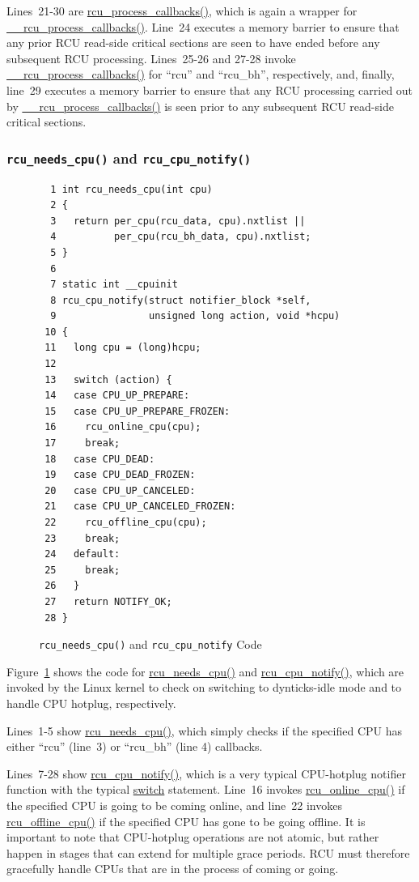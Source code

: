 Lines~21-30 are \url{rcu_process_callbacks()}, which is again a
wrapper for \url{__rcu_process_callbacks()}.
Line~24 executes a memory barrier to ensure that any prior RCU
read-side critical sections are seen to have ended before any
subsequent RCU processing.
Lines~25-26 and 27-28 invoke \url{__rcu_process_callbacks()} for
``rcu'' and ``rcu\_bh'', respectively, and, finally,
line~29 executes a memory barrier to ensure that any RCU
processing carried out by \url{__rcu_process_callbacks()}
is seen prior to any subsequent RCU read-side critical sections.

\subsubsection{{\tt rcu\_needs\_cpu()} and {\tt rcu\_cpu\_notify()}}
\label{app:rcuimpl:rcutreewt:rcu-needs-cpu and rcu-cpu-notify}

\begin{figure}[tbp]
{ \scriptsize
\begin{verbatim}
  1 int rcu_needs_cpu(int cpu)
  2 {
  3   return per_cpu(rcu_data, cpu).nxtlist ||
  4          per_cpu(rcu_bh_data, cpu).nxtlist;
  5 }
  6 
  7 static int __cpuinit
  8 rcu_cpu_notify(struct notifier_block *self,
  9                unsigned long action, void *hcpu)
 10 {
 11   long cpu = (long)hcpu;
 12 
 13   switch (action) {
 14   case CPU_UP_PREPARE:
 15   case CPU_UP_PREPARE_FROZEN:
 16     rcu_online_cpu(cpu);
 17     break;
 18   case CPU_DEAD:
 19   case CPU_DEAD_FROZEN:
 20   case CPU_UP_CANCELED:
 21   case CPU_UP_CANCELED_FROZEN:
 22     rcu_offline_cpu(cpu);
 23     break;
 24   default:
 25     break;
 26   }
 27   return NOTIFY_OK;
 28 }
\end{verbatim}
}
\caption{{\tt rcu\_needs\_cpu()} and {\tt rcu\_cpu\_notify}  Code}
\label{fig:app:rcuimpl:rcutreewt:Code for rcu-needs-cpu and rcu-cpu-notify}
\end{figure}

Figure~\ref{fig:app:rcuimpl:rcutreewt:Code for rcu-needs-cpu and rcu-cpu-notify}
shows the code for \url{rcu_needs_cpu()} and \url{rcu_cpu_notify()},
which are invoked by the Linux kernel to check on switching to
dynticks-idle mode and to handle CPU hotplug, respectively.

Lines~1-5 show \url{rcu_needs_cpu()}, which simply checks if the specified
CPU has either ``rcu'' (line~3) or ``rcu\_bh'' (line 4) callbacks.

Lines~7-28 show \url{rcu_cpu_notify()}, which is a very typical
CPU-hotplug notifier function with the typical \url{switch} statement.
Line~16 invokes \url{rcu_online_cpu()} if the specified CPU is going
to be coming online, and line~22 invokes \url{rcu_offline_cpu()} if
the specified CPU has gone to be going offline.
It is important to note that CPU-hotplug operations are not atomic,
but rather happen in stages that can extend for multiple grace periods.
RCU must therefore gracefully handle CPUs that are in the process
of coming or going.

